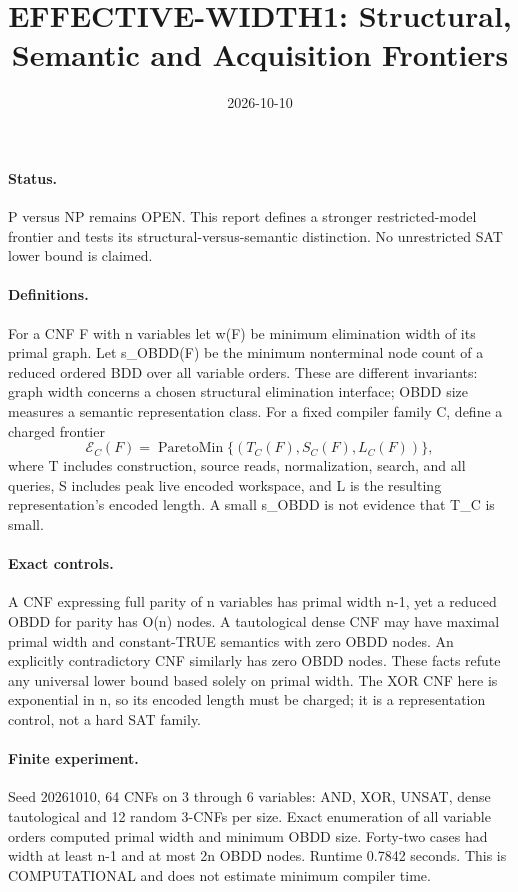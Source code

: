 \documentclass{article}
\begin{document}
\title{EFFECTIVE-WIDTH1: Structural, Semantic and Acquisition Frontiers}
\date{2026-10-10}\maketitle
\paragraph{Status.} P versus NP remains OPEN. This report defines a stronger restricted-model frontier and tests its structural-versus-semantic distinction. No unrestricted SAT lower bound is claimed.
\paragraph{Definitions.} For a CNF F with n variables let w(F) be minimum elimination width of its primal graph. Let s_{\rm OBDD}(F) be the minimum nonterminal node count of a reduced ordered BDD over all variable orders. These are different invariants: graph width concerns a chosen structural elimination interface; OBDD size measures a semantic representation class. For a fixed compiler family C, define a charged frontier
\[
\mathcal E_C(F)=\operatorname{ParetoMin}\{(T_C(F),S_C(F),L_C(F))\},
\]
where T includes construction, source reads, normalization, search, and all queries, S includes peak live encoded workspace, and L is the resulting representation's encoded length. A small s_{\rm OBDD} is not evidence that T_C is small.
\paragraph{Exact controls.} A CNF expressing full parity of n variables has primal width n-1, yet a reduced OBDD for parity has O(n) nodes. A tautological dense CNF may have maximal primal width and constant-TRUE semantics with zero OBDD nodes. An explicitly contradictory CNF similarly has zero OBDD nodes. These facts refute any universal lower bound based solely on primal width. The XOR CNF here is exponential in n, so its encoded length must be charged; it is a representation control, not a hard SAT family.
\paragraph{Finite experiment.} Seed 20261010, 64 CNFs on 3 through 6 variables: AND, XOR, UNSAT, dense tautological and 12 random 3-CNFs per size. Exact enumeration of all variable orders computed primal width and minimum OBDD size. Forty-two cases had width at least n-1 and at most 2n OBDD nodes. Runtime 0.7842 seconds. This is COMPUTATIONAL and does not estimate minimum compiler time.
\end{document}
